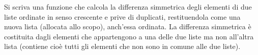 \begin{Exercise}[label={ex:simmetrica}]
    Si scriva una funzione che calcola la differenza simmetrica degli elementi di due liste ordinate 
    in senso crescente e prive di duplicati, restituendola come una nuova lista (allocata allo scopo), 
    anch’essa ordinata. La differenza simmetrica è costituita dagli elementi che appartengono a una delle due liste ma non all’altra
    lista (contiene cioè tutti gli elementi che non sono in comune alle due liste).
\end{Exercise}

\begin{Answer}[ref={ex:simmetrica}]
  	
\end{Answer}